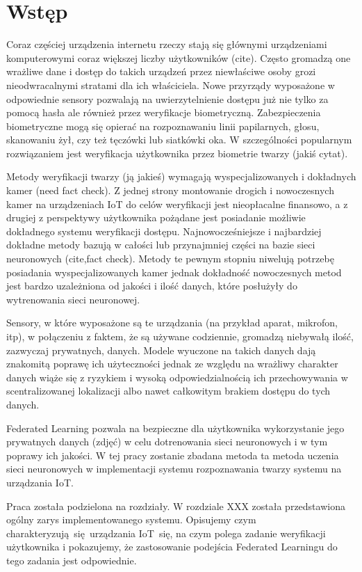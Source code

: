 \newpage
\section[wstep]{Wstęp}

Coraz częściej urządzenia internetu rzeczy stają się głównymi urządzeniami komputerowymi coraz
większej liczby użytkowników (cite). Często gromadzą one wrażliwe dane i dostęp do takich
urządzeń przez niewłaściwe osoby grozi nieodwracalnymi stratami dla ich właściciela. Nowe
przyrządy wyposażone w odpowiednie sensory pozwalają na uwierzytelnienie dostępu już nie tylko za
pomocą hasła ale również przez weryfikacje biometryczną. Zabezpieczenia biometryczne mogą się
opierać na rozpoznawaniu linii papilarnych, głosu, skanowaniu żył, czy też tęczówki lub siatkówki
oka. W szczególności popularnym rozwiązaniem jest weryfikacja użytkownika przez biometrie twarzy
(jakiś cytat).

Metody weryfikacji twarzy (ją jakieś) wymagają wyspecjalizowanych i dokładnych kamer (need fact
check). Z jednej strony montowanie drogich i nowoczesnych kamer na urządzeniach IoT do celów
weryfikacji jest nieopłacalne finansowo, a z drugiej z perspektywy użytkownika pożądane jest
posiadanie możliwie dokładnego systemu weryfikacji dostępu. Najnowocześniejsze i najbardziej
dokładne metody bazują w całości lub przynajmniej części na bazie sieci neuronowych (cite,fact
check). Metody te pewnym stopniu niwelują potrzebę posiadania wyspecjalizowanych kamer jednak
dokładność nowoczesnych metod jest bardzo uzależniona od jakości i ilość danych, które posłużyły
do wytrenowania sieci neuronowej.

Sensory, w które wyposażone są te urządzania (na przykład aparat, mikrofon, itp), w połączeniu z
faktem, że są używane codziennie, gromadzą niebywałą ilość, zazwyczaj prywatnych,
danych. Modele wyuczone na takich danych dają znakomitą poprawę ich użyteczności jednak ze względu
na wrażliwy charakter danych wiąże się z ryzykiem i wysoką odpowiedzialnością ich
przechowywania w scentralizowanej lokalizacji albo nawet całkowitym brakiem dostępu do tych
danych.

Federated Learning pozwala na bezpieczne dla użytkownika wykorzystanie jego prywatnych danych
(zdjęć) w celu dotrenowania sieci neuronowych i w tym poprawy ich jakości. W tej pracy zostanie
zbadana metoda ta metoda uczenia sieci neuronowych w implementacji systemu rozpoznawania twarzy
systemu na urządzania IoT.

Praca została podzielona na rozdziały. W rozdziale XXX została przedstawiona ogólny zarys implementowanego systemu. Opisujemy czym charakteryzują się urządzania IoT się, na czym polega zadanie weryfikacji użytkownika i pokazujemy, że zastosowanie podejścia Federated Learningu do tego zadania jest odpowiednie.

